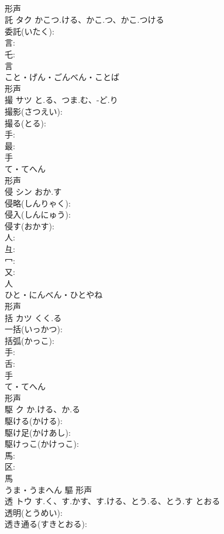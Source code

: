 \documentclass[8pt]{extreport}
\begin{document}
\begin{CJK}{UTF8}{min}
\\	形声 
\\	託	タク	かこつ.ける、かこ.つ、かこ.つける		
\\	委託(いたく): 
\\	言: 
\\	乇: 
\\	言	
\\	こと・げん・ごんべん・ことば	
\\	形声 
\\	撮	サツ	と.る、つま.む、-ど.り		
\\	撮影(さつえい): 
\\	撮る(とる): 
\\	手: 
\\	最: 
\\	手	
\\	て・てへん	
\\	形声 
\\	侵	シン	おか.す		
\\	侵略(しんりゃく): 
\\	侵入(しんにゅう): 
\\	侵す(おかす): 
\\	人: 
\\	彑: 
\\	冖: 
\\	又: 
\\	人	
\\	ひと・にんべん・ひとやね	
\\	形声 
\\	括	カツ	くく.る		
\\	一括(いっかつ): 
\\	括弧(かっこ): 
\\	手: 
\\	舌: 
\\	手	
\\	て・てへん	
\\	形声 
\\	駆	ク	か.ける、か.る		
\\	駆ける(かける): 
\\	駆け足(かけあし): 
\\	駆けっこ(かけっこ): 
\\	馬: 
\\	区: 
\\	馬	
\\	うま・うまへん	驅	形声 
\\	透	トウ	す.く、す.かす、す.ける、とう.る、とう.す	とおる	
\\	透明(とうめい): 
\\	透き通る(すきとおる): 

\end{CJK}
\end{document}
